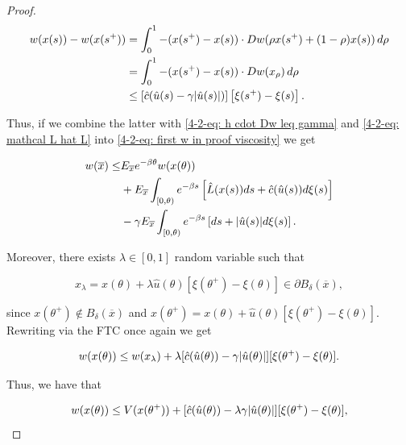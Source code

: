 \begin{theorem}
\begin{proof}
        \begin{align*}
            w(x(s)) - w(x(s^+)) & = \int_0^1 -(x(s^+) - x(s))\cdot Dw(\rho x(s^+)+(1-\rho)x(s)) \,d\rho \\
            & = \int_0^1 -(x(s^+) - x(s))\cdot Dw(x_{\rho}) \,d\rho \\
            & \leq \left[\hat{c}(\hat{u}(s) - \gamma\abs{\hat{u}(s)})\right]\left[\xi(s^+) - \xi(s)\right].
        \end{align*}

        Thus, if we combine the latter with \eqref{4-2-eq: h cdot Dw leq gamma} and \eqref{4-2-eq: mathcal L hat L} into \eqref{4-2-eq: first w in proof viscosity} we get

        \begin{equation}\label{last not}
            \begin{aligned}
                w(\overline{x}) \leq & E_{\overline{x}} e^{-\beta \theta}w(x(\theta)) \\
                & + E_{\overline{x}} \int_{[0,\theta)} e^{-\beta s}\left[\hat{L}(x(s))ds + \hat{c}(\hat{u}(s))d\xi(s)\right] \\
                & - \gamma E_{\overline{x}} \int_{[0,\theta)} e^{-\beta s} \left[ds + \abs{\hat{u}(s)}d\xi(s)\right]. 
            \end{aligned}
        \end{equation}

        Moreover, there exists $\lambda\in[0,1]$ random variable such that

        \[x_{\lambda} = x(\theta) + \lambda \hat{u}(\theta)[\xi(\theta^+) - \xi(\theta)] \in \partial B_{\delta}(\overline{x}),\]

        since $x(\theta^+)\notin B_{\delta}(\overline{x})$ and $x(\theta^+)=x(\theta) + \hat{u}(\theta)[\xi(\theta^+) - \xi(\theta)]$. Rewriting via the FTC once again we get

        \begin{equation*}
            w(x(\theta))\leq w(x_{\lambda}) + \lambda[\hat{c}(\hat{u}(\theta))-\gamma\abs{\hat{u}(\theta)}][\xi(\theta^+)-\xi(\theta)].
        \end{equation*}

        Thus, we have that

        \begin{equation*}
            w(x(\theta)) \leq V(x(\theta^+)) + [\hat{c}(\hat{u}(\theta))-\lambda\gamma\abs{\hat{u}(\theta)}][\xi(\theta^+)-\xi(\theta)],
        \end{equation*}


\end{proof}
\end{theorem}
